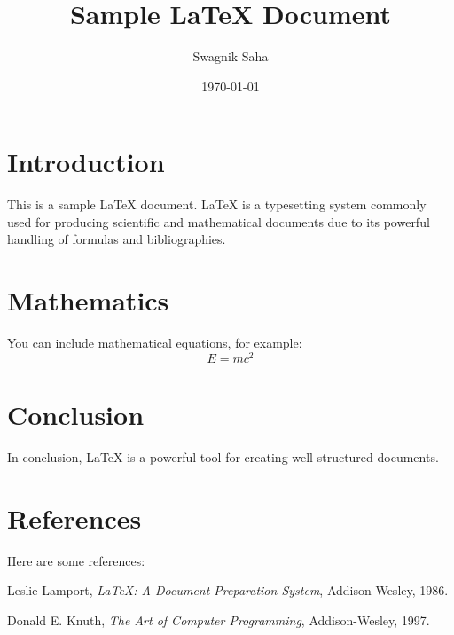 \documentclass{article}
\title{Sample LaTeX Document}
\author{Swagnik Saha}
\date{\today}
\begin{document}
\maketitle

\section{Introduction}
This is a sample LaTeX document. LaTeX is a typesetting system commonly used for producing scientific and mathematical documents due to its powerful handling of formulas and bibliographies.

\section{Mathematics}
You can include mathematical equations, for example:
\begin{equation}
E = mc^2
\end{equation}

\section{Conclusion}
In conclusion, LaTeX is a powerful tool for creating well-structured documents. 

\section{References}
Here are some references:

\begin{thebibliography}{9}
 Leslie Lamport,
 \textit{LaTeX: A Document Preparation System},
 Addison Wesley, 1986.

 Donald E. Knuth,
 \textit{The Art of Computer Programming},
 Addison-Wesley, 1997.
\end{thebibliography}
\end{document}
